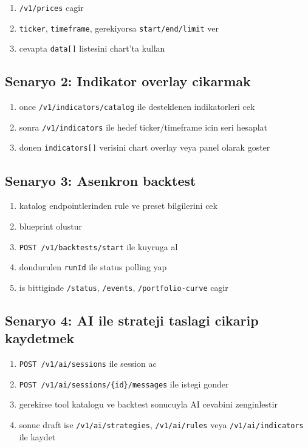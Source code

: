 \documentclass[11pt,a4paper]{article}
\begin{document}
\begin{enumerate}[leftmargin=1.5em]
    \item \texttt{/v1/prices} cagir
    \item \texttt{ticker}, \texttt{timeframe}, gerekiyorsa \texttt{start/end/limit} ver
    \item cevapta \texttt{data[]} listesini chart'ta kullan
\end{enumerate}

\subsection{Senaryo 2: Indikator overlay cikarmak}

\begin{enumerate}[leftmargin=1.5em]
    \item once \texttt{/v1/indicators/catalog} ile desteklenen indikatorleri cek
    \item sonra \texttt{/v1/indicators} ile hedef ticker/timeframe icin seri hesaplat
    \item donen \texttt{indicators[]} verisini chart overlay veya panel olarak goster
\end{enumerate}

\subsection{Senaryo 3: Asenkron backtest}

\begin{enumerate}[leftmargin=1.5em]
    \item katalog endpointlerinden rule ve preset bilgilerini cek
    \item blueprint olustur
    \item \texttt{POST /v1/backtests/start} ile kuyruga al
    \item dondurulen \texttt{runId} ile status polling yap
    \item is bittiginde \texttt{/status}, \texttt{/events}, \texttt{/portfolio-curve} cagir
\end{enumerate}

\subsection{Senaryo 4: AI ile strateji taslagi cikarip kaydetmek}

\begin{enumerate}[leftmargin=1.5em]
    \item \texttt{POST /v1/ai/sessions} ile session ac
    \item \texttt{POST /v1/ai/sessions/\{id\}/messages} ile istegi gonder
    \item gerekirse tool katalogu ve backtest sonucuyla AI cevabini zenginlestir
    \item sonuc draft ise \texttt{/v1/ai/strategies}, \texttt{/v1/ai/rules} veya \texttt{/v1/ai/indicators} ile kaydet
\end{enumerate}
\end{document}
